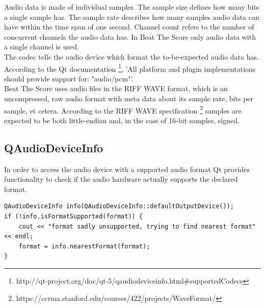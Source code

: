 Audio data is made of individual samples. The sample size defines how many bits a single 
sample has. The sample rate describes how many samples audio data can have within the 
time span of one second. Channel count refers to the number of concurrent channels the 
audio data has. In Beat The Score only audio data with a single channel is used. 
\\
The codec tells the audio device which format the to-be-expected audio data has. 
According to the Qt documentation \footnote{\label{foot:1}http://qt-project.org/doc/qt-5/qaudiodeviceinfo.html\#supportedCodecs}, 
'All platform and plugin implementations should provide support for: "audio/pcm"'.
\\
Beat The Score uses audio files in the RIFF WAVE format, which is an uncompressed, 
raw audio format with meta data about its sample rate, bits per sample, et cetera. 
According to the RIFF WAVE specification \footnote{\label{foot:2}https://ccrma.stanford.edu/courses/422/projects/WaveFormat/} samples are expected to be both little-endian and, in the case of 16-bit samples, signed.

\subsection{QAudioDeviceInfo}

In order to access the audio device with a supported audio format Qt provides 
functionality to check if the audio hardware actually supports the declared format.

\begin{lstlisting}
QAudioDeviceInfo info(QAudioDeviceInfo::defaultOutputDevice());
if (!info.isFormatSupported(format)) {
    cout << "format sadly unsupported, trying to find nearest format" << endl;
    format = info.nearestFormat(format);
}
\end{lstlisting}

